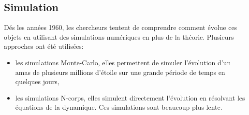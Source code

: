 		\subsection{Simulation}
			Dés les années 1960, les chercheurs tentent de comprendre comment évolue ces
			objets en utilisant des simulations numériques en plus de la théorie.
			Plusieurs approches ont été utilisées:
			\begin{itemize}
					\item les simulations Monte-Carlo, elles permettent de
						simuler l'évolution d'un amas de plusieurs millions
						d'étoile sur une grande période de temps en quelques
						jours,
					\item les simulations N-corps, elles simulent directement
						l'évolution en résolvant les équations de la
						dynamique. Ces simulations sont beaucoup plus lente.
			\end{itemize}



